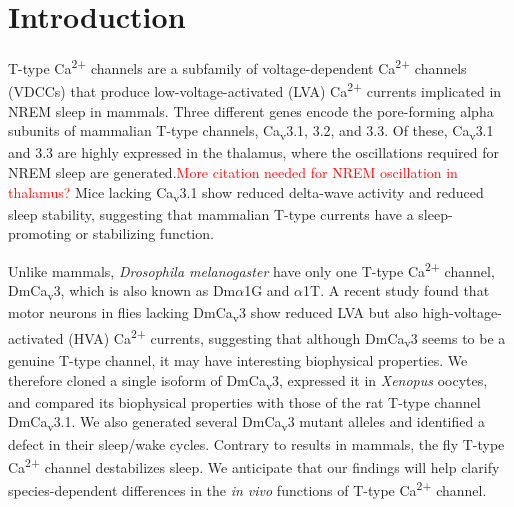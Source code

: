 \section*{Introduction}

T-type Ca\textsuperscript{2+} channels are a subfamily of voltage-dependent Ca\textsuperscript{2+} channels (VDCCs) that produce low-voltage-activated (LVA) Ca\textsuperscript{2+} currents implicated in NREM sleep in mammals\cite{Lee:2004ey}.
Three different genes encode the pore-forming alpha subunits of mammalian T-type channels, Ca\textsubscript{v}3.1, 3.2, and 3.3. Of these, Ca\textsubscript{v}3.1 and 3.3 are highly expressed in the thalamus, where the oscillations required for NREM sleep are generated\cite{PerezReyes:1998gn}.\textcolor{red}{More citation needed for NREM oscillation in thalamus?}
Mice lacking Ca\textsubscript{v}3.1 show reduced delta-wave activity and reduced sleep stability, suggesting that mammalian T-type currents have a sleep-promoting or stabilizing function\cite{Lee:2004ey}.

Unlike mammals, \emph{Drosophila melanogaster} have only one T-type Ca\textsuperscript{2+} channel, DmCa\textsubscript{v}3, which is also known as Dm$\alpha$1G and $\alpha$1T.
A recent study found that motor neurons in flies lacking DmCa\textsubscript{v}3 show reduced LVA but also high-voltage-activated (HVA) Ca\textsuperscript{2+} currents, suggesting that although DmCa\textsubscript{v}3 seems to be a genuine T-type channel, it may have interesting biophysical properties\cite{Ryglewski:2012jk}.
We therefore cloned a single isoform of DmCa\textsubscript{v}3,  expressed it in \emph{Xenopus} oocytes, and compared its biophysical properties with those of the rat T-type channel DmCa\textsubscript{v}3.1.
We also generated several DmCa\textsubscript{v}3 mutant alleles and identified a defect in their sleep/wake cycles. Contrary to results in mammals, the fly T-type Ca\textsuperscript{2+} channel destabilizes sleep.
We anticipate that our findings will help clarify species-dependent differences in the \emph{in vivo} functions of T-type Ca\textsuperscript{2+} channel.
    
    
  
  
  
  